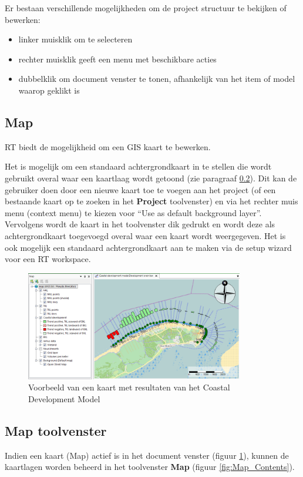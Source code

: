 Er bestaan verschillende mogelijkheden om de project structuur te bekijken of bewerken:
\begin{itemize}
\item linker muisklik om te selecteren
\item rechter muisklik geeft een menu met beschikbare acties
\item dubbelklik om document venster te tonen, afhankelijk van het item of model waarop geklikt is
\end{itemize}

\subsection{Map}
	\label{sec:RT_MapView}
RT biedt de mogelijkheid om een GIS kaart te bewerken. 


Het is mogelijk om een standaard achtergrondkaart in te stellen die wordt gebruikt overal waar een kaartlaag wordt getoond (zie paragraaf \ref{sec:RT_Map_Contents}). Dit kan de gebruiker doen door een nieuwe kaart toe te voegen aan het project (of een bestaande kaart op te zoeken in het \textbf{Project} toolvenster) en via het rechter muis menu (context menu) te kiezen voor "`Use as default background layer"'. Vervolgens wordt de kaart in het toolvenster dik gedrukt en wordt deze als achtergrondkaart toegevoegd overal waar een kaart wordt weergegeven. Het is ook mogelijk een standaard achtergrondkaart aan te maken via de setup wizard voor een RT workspace.

\begin{figure}[H]
	\centering
		\includegraphics[width=0.85\textwidth]{figures/chapter_general/Map_With_MapContents.png}
		\caption{Voorbeeld van een kaart met resultaten van het Coastal Development Model}
	\label{fig:RT_Map}
\end{figure}

\subsection{Map toolvenster}
	\label{sec:RT_Map_Contents}
Indien een kaart (Map) actief is in het document venster (figuur \ref{fig:RT_Map}), kunnen de kaartlagen worden beheerd in het toolvenster \textbf{Map} (figuur \ref{fig:Map_Contents}).

